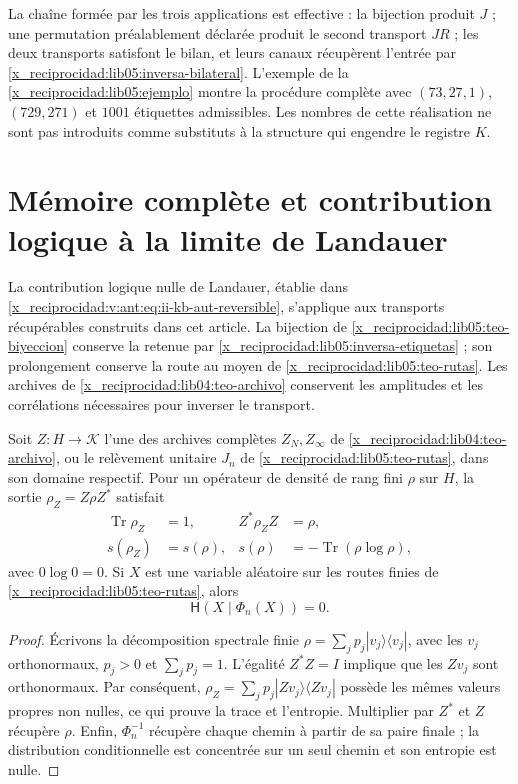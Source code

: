 La chaîne formée par les trois applications est effective : la bijection produit \(J\) ; une permutation préalablement déclarée produit le second transport \(JR\) ; les deux transports satisfont le bilan, et leurs canaux récupèrent l'entrée par \eqref{x_reciprocidad:lib05:inversa-bilateral}. L'exemple de la \cref{x_reciprocidad:lib05:ejemplo} montre la procédure complète avec \((73,27,1)\), \((729,271)\) et \(1001\) étiquettes admissibles. Les nombres de cette réalisation ne sont pas introduits comme substituts à la structure qui engendre le registre \(K\).

\section{Mémoire complète et contribution logique à la limite de Landauer}
\label{x_reciprocidad:landauer:puente-archivo}

La contribution logique nulle de Landauer, établie dans
\eqref{x_reciprocidad:v:ant:eq:ii-kb-aut-reversible}, s’applique aux transports
récupérables construits dans cet article. La bijection de
\cref{x_reciprocidad:lib05:teo-biyeccion} conserve la retenue par
\eqref{x_reciprocidad:lib05:inversa-etiquetas} ; son prolongement conserve la route
au moyen de \cref{x_reciprocidad:lib05:teo-rutas}. Les archives de
\cref{x_reciprocidad:lib04:teo-archivo} conservent les amplitudes et les corrélations
nécessaires pour inverser le transport.

\begin{corollary}
\label{x_reciprocidad:landauer:cor-archivo}
Soit \(Z:H\to\mathcal K\) l’une des archives complètes
\(Z_N,Z_\infty\) de \cref{x_reciprocidad:lib04:teo-archivo}, ou le relèvement
unitaire \(J_n\) de \cref{x_reciprocidad:lib05:teo-rutas}, dans son domaine respectif.
Pour un opérateur de densité de rang fini \(\rho\) sur \(H\),
la sortie \(\rho_Z=Z\rho Z^*\) satisfait
\begin{align}
 \operatorname{Tr}\rho_Z&=1,& Z^*\rho_ZZ&=\rho,\\
 s(\rho_Z)&=s(\rho),&
 s(\rho)&=-\operatorname{Tr}(\rho\log\rho),
 \label{x_reciprocidad:landauer:espectro}
\end{align}
avec \(0\log0=0\). Si \(X\) est une variable aléatoire sur les routes
finies de \cref{x_reciprocidad:lib05:teo-rutas}, alors
\begin{equation}
 \mathsf H(X\mid\Phi_n(X))=0.
 \label{x_reciprocidad:landauer:recuperacion-ruta}
\end{equation}
\end{corollary}
\begin{proof}
Écrivons la décomposition spectrale finie \(\rho=\sum_jp_j|v_j\rangle\langle v_j|\), avec les \(v_j\) orthonormaux, \(p_j>0\) et \(\sum_jp_j=1\). L'égalité \(Z^*Z=I\) implique que les \(Zv_j\) sont orthonormaux. Par conséquent, \(\rho_Z=\sum_jp_j|Zv_j\rangle\langle Zv_j|\) possède les mêmes valeurs propres non nulles, ce qui prouve la trace et l'entropie. Multiplier par \(Z^*\) et \(Z\) récupère \(\rho\). Enfin, \(\Phi_n^{-1}\) récupère chaque chemin à partir de sa paire finale ; la distribution conditionnelle est concentrée sur un seul chemin et son entropie est nulle.
\end{proof}

